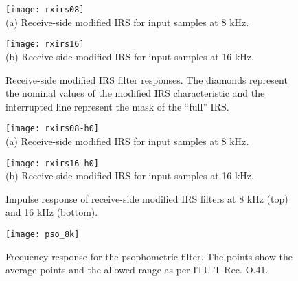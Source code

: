 \begin{figure}[hbtp]
  \begin{center}
     \texttt{[image: rxirs08]}
    \\
   (a) Receive-side modified IRS for input samples at 8 kHz.

     \texttt{[image: rxirs16]}
    \\
   (b) Receive-side modified IRS for input samples at 16 kHz.

  \end{center}
  \caption{\SF Receive-side modified IRS filter responses.
               The diamonds represent the nominal values of the
               modified IRS characteristic and the interrupted line
               represent the mask of the ``full'' IRS.
               \label{rx-mod-irs-frq}}
\end{figure}

\flushfloats
\begin{figure}[hbtp]
  \begin{center}
     \texttt{[image: rxirs08-h0]}
    \\
   (a) Receive-side modified IRS for input samples at 8 kHz.

     \texttt{[image: rxirs16-h0]}
    \\
   (b) Receive-side modified IRS for input samples at 16 kHz.

  \end{center}
  \caption{\SF Impulse response of receive-side modified IRS filters at 8 kHz
               (top) and 16 kHz (bottom). \label{rx-mod-irs-ir}
          }
\end{figure}


\begin{figure}[hbtp]
  \begin{center}
 \texttt{[image: pso\_8k]}
  \end{center}
  \caption{\SF Frequency response for the psophometric filter. The
               points show the average points and the allowed range as per
               ITU-T Rec. O.41.
               \label{pso-08k-frq}
          }

\end{figure}


